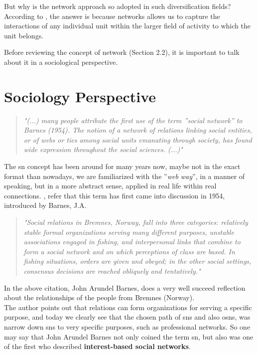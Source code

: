 \indent But why is the network approach so adopted in such diversification fields? According to \citep{kilduff2003social}, the answer is because networks allows us to capture the interactions of any individual unit within the larger field of activity to which the unit belongs.

\indent Before reviewing the concept of network (Section 2.2), it is important to talk about it in a sociological perspective.


\section{Sociology Perspective}
\begin{quote}
\textit{"(...) many people attribute the first use of the term ''social network'' to
Barnes (1954). The notion of a network of relations linking social entities, or of webs or ties among social units emanating through society, has
found wide expression throughout the social sciences. (...)"}
\citep{wasserman1994social}
\end{quote}

The \gls{sn} concept has been around for many years now, maybe not in the exact format than nowadays, we are familiarized with the ''\textit{web way}'', in a manner of speaking, but in a more abstract sense, applied in real life within real connections.
\citep{wasserman1994social}, refer that this term has first came into discussion in 1954, introduced by Barnes, J.A.

\begin{quote}
\textit{"Social relations in Bremnes, Norway, fall into three categories: relatively stable formal organizations serving many different
purposes, unstable associations engaged in fishing, and interpersonal links that combine to form a social
network and on which perceptions of class are based. In fishing situations, orders are given and
obeyed; in the other social settings, consensus decisions are reached obliquely and tentatively."}
\citep{barnes1954class}
\end{quote}

In the above citation, John Arundel Barnes, does a very well succeed reflection about the relationships of the people from Bremnes (Norway).\\
\indent The author points out that relations can form organizations for serving a specific purpose, and today we clearly see that the chosen path of
\glspl{sn} and also \glspl{osn}, was narrow down \glspl{sn} to very specific purposes, such as professional networks. So one may say that John
Arundel Barnes not only coined the term \gls{sn}, but also was one of the first who described \textbf{interest-based social networks}.\\


